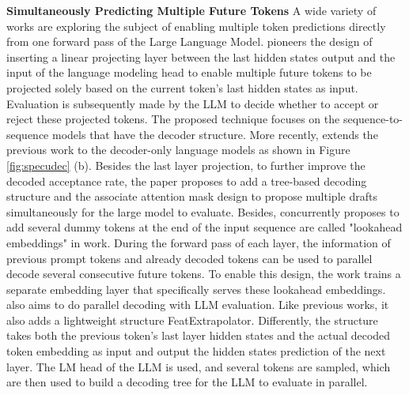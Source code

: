 \textbf{Simultaneously Predicting Multiple Future Tokens} A wide variety of works are exploring the subject of enabling multiple token predictions directly from one forward pass of the Large Language Model. \cite{stern2018blockwise} pioneers the design of inserting a linear projecting layer between the last hidden states output and the input of the language modeling head to enable multiple future tokens to be projected solely based on the current token's last hidden states as input. Evaluation is subsequently made by the LLM to decide whether to accept or reject these projected tokens. The proposed technique focuses on the sequence-to-sequence models that have the decoder structure. 
More recently, \cite{cai2024medusa} extends the previous work to the decoder-only language models as shown in Figure \ref{fig:specudec} (b). Besides the last layer projection, to further improve the decoded acceptance rate, the paper proposes to add a tree-based decoding structure and the associate attention mask design to propose multiple drafts simultaneously for the large model to evaluate. 
Besides, concurrently \cite{monea2023pass} proposes to add several dummy tokens at the end of the input sequence are called "lookahead embeddings" in work. 
During the forward pass of each layer, the information of previous prompt tokens and already decoded tokens can be used to parallel decode several consecutive future tokens. 
To enable this design, the work trains a separate embedding layer that specifically serves these lookahead embeddings. \cite{li2024eagle} also aims to do parallel decoding with LLM evaluation. Like previous works, it also adds a lightweight structure FeatExtrapolator. Differently, the structure takes both the previous token's last layer hidden states and the actual decoded token embedding as input and output the hidden states prediction of the next layer. The LM head of the LLM is used, and several tokens are sampled, which are then used to build a decoding tree for the LLM to evaluate in parallel. 

